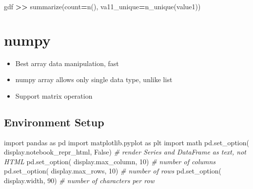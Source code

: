 \documentclass[
]{book}
\newenvironment{Shaded}{\begin{snugshade}}{\end{snugshade}}
\newcommand{\CommentTok}[1]{\textcolor[rgb]{0.37,0.37,0.37}{\textit{#1}}}
\newcommand{\DecValTok}[1]{\textcolor[rgb]{0.06,0.06,0.06}{#1}}
\newcommand{\ImportTok}[1]{#1}
\newcommand{\NormalTok}[1]{#1}
\newcommand{\OperatorTok}[1]{\textcolor[rgb]{0.43,0.43,0.43}{\textbf{#1}}}
\newcommand{\StringTok}[1]{\textcolor[rgb]{0.5,0.5,0.5}{#1}}
\newcommand{\VariableTok}[1]{\textcolor[rgb]{0,0,0}{#1}}
\providecommand{\tightlist}{%
  \setlength{\itemsep}{0pt}\setlength{\parskip}{0pt}}
\begin{document}
\begin{Shaded}
\begin{Highlighting}[]
\NormalTok{gdf }\OperatorTok{\textgreater{}\textgreater{}}\NormalTok{ summarize(count}\OperatorTok{=}\StringTok{\textquotesingle{}n()\textquotesingle{}}\NormalTok{, va11\_unique}\OperatorTok{=}\StringTok{\textquotesingle{}n\_unique(value1)\textquotesingle{}}\NormalTok{)}
\end{Highlighting}
\end{Shaded}

\hypertarget{numpy-1}{%
\chapter{numpy}\label{numpy-1}}

\begin{itemize}
\tightlist
\item
  Best array data manipulation, fast\\
\item
  numpy array allows only single data type, unlike list\\
\item
  Support matrix operation
\end{itemize}

\hypertarget{environment-setup}{%
\section{Environment Setup}\label{environment-setup}}

\begin{Shaded}
\begin{Highlighting}[]
\ImportTok{import}\NormalTok{ pandas }\ImportTok{as}\NormalTok{ pd}
\ImportTok{import}\NormalTok{ matplotlib.pyplot }\ImportTok{as}\NormalTok{ plt}
\ImportTok{import}\NormalTok{ math}
\NormalTok{pd.set\_option( }\StringTok{\textquotesingle{}display.notebook\_repr\_html\textquotesingle{}}\NormalTok{, }\VariableTok{False}\NormalTok{)  }\CommentTok{\# render Series and DataFrame as text, not HTML}
\NormalTok{pd.set\_option( }\StringTok{\textquotesingle{}display.max\_column\textquotesingle{}}\NormalTok{, }\DecValTok{10}\NormalTok{)    }\CommentTok{\# number of columns}
\NormalTok{pd.set\_option( }\StringTok{\textquotesingle{}display.max\_rows\textquotesingle{}}\NormalTok{, }\DecValTok{10}\NormalTok{)     }\CommentTok{\# number of rows}
\NormalTok{pd.set\_option( }\StringTok{\textquotesingle{}display.width\textquotesingle{}}\NormalTok{, }\DecValTok{90}\NormalTok{)        }\CommentTok{\# number of characters per row}
\end{Highlighting}
\end{Shaded}
\end{document}
